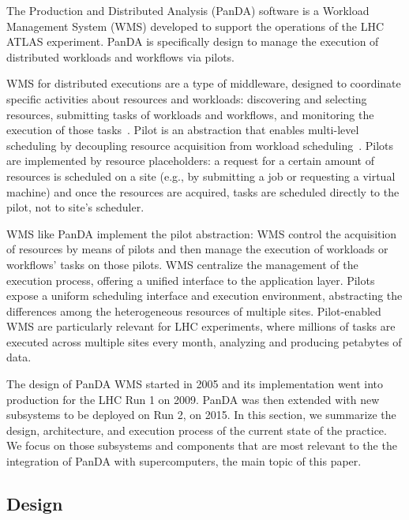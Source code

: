 The Production and Distributed Analysis (PanDA) software is a Workload
Management System (WMS) developed to support the operations of the LHC ATLAS
experiment. PanDA is specifically design to manage the execution of distributed
workloads and workflows via pilots.

WMS for distributed executions are a type of middleware, designed to coordinate
specific activities about resources and workloads: discovering and selecting
resources, submitting tasks of workloads and workflows, and monitoring the
execution of those tasks~\cite{marco2009glite}. Pilot is an abstraction that
enables multi-level scheduling by decoupling resource acquisition from workload
scheduling~\cite{turilli2015comprehensive}. Pilots are implemented by resource
placeholders: a request for a certain amount of resources is scheduled on a site
(e.g., by submitting a job or requesting a virtual machine) and once the
resources are acquired, tasks are scheduled directly to the pilot, not to site's
scheduler.

WMS like PanDA implement the pilot abstraction: WMS control the acquisition of
resources by means of pilots and then manage the execution of workloads or
workflows' tasks on those pilots. WMS centralize the management of the execution
process, offering a unified interface to the application layer. Pilots expose a
uniform scheduling interface and execution environment, abstracting the
differences among the heterogeneous resources of multiple sites. Pilot-enabled
WMS are particularly relevant for LHC experiments, where millions of tasks are
executed across multiple sites every month, analyzing and producing petabytes of
data.

The design of PanDA WMS started in 2005 and its implementation went into
production for the LHC Run 1 on 2009. PanDA was then extended with new
subsystems to be deployed on Run 2, on 2015. In this section, we summarize the
design, architecture, and execution process of the current state of the
practice. We focus on those subsystems and components that are most relevant to
the the integration of PanDA with supercomputers, the main topic of this paper.


\subsection{Design}
\label{ssec:panda_design}

